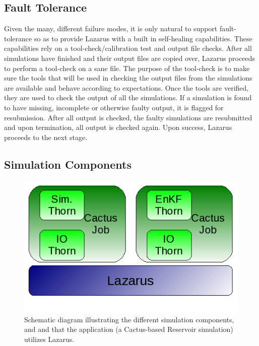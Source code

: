 \documentclass{sig-alternate}
\newcommand{\up}{\vspace*{-0.3em}}
\begin{document}
\subsection{Fault Tolerance}
Given the many, different failure modes, it is only natural to support
fault-tolerance so as to provide Lazarus with a built in self-healing
capabilities. These capabilities rely on a tool-check/calibration test
and output file checks. After all simulations have finished and their
output files are copied over, Lazarus proceeds to perform a tool-check
on a sane file. The purpose of the tool-check is to make sure the
tools that will be used in checking the output files from the
simulations are available and behave according to expectations. Once
the tools are verified, they are used to check the output of all the
simulations. If a simulation is found to have missing, incomplete or
otherwise faulty output, it is flagged for resubmission.  After all
output is checked, the faulty simulations are resubmitted and upon
termination, all output is checked again. Upon success, Lazarus
proceeds to the next stage.


\subsection{Simulation Components}
\begin{figure}
\begin{center}
\includegraphics[scale=0.5]{./figures/Simulations.png}
\caption{Schematic diagram illustrating the different simulation components, and and that the application (a Cactus-based Reservoir
  simulation) utilizes Lazarus.}\label{fig:application_usage} 
\up\up\up \up\up\up \up\up\up \up\up\up \up\up
\end{center} 
\end{figure}
 
\end{document}
